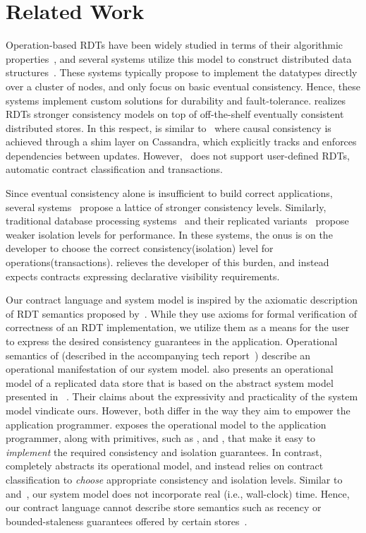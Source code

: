 \section{Related Work}
\label{sec:related}

Operation-based RDTs have been widely studied in terms of their algorithmic
properties~\cite{SSS,Burckhardt2014}, and several systems utilize this model to
construct distributed data structures~\cite{Cassandra,Bayou,Tango}. These
systems typically propose to implement the datatypes directly over a cluster of
nodes, and only focus on basic eventual consistency. Hence, these systems
implement custom solutions for durability and fault-tolerance. \name realizes
RDTs stronger consistency models on top of off-the-shelf eventually consistent
distributed stores. In this respect, \name is similar to~\cite{BoltOn} where
causal consistency is achieved through a shim layer on Cassandra, which
explicitly tracks and enforces dependencies between updates.
However,~\cite{BoltOn} does not support user-defined RDTs, automatic contract
classification and transactions.

Since eventual consistency alone is insufficient to build correct applications,
several systems~\cite{Bayou,Pileus,RedBlue} propose a lattice of stronger
consistency levels. Similarly, traditional database processing
systems~\cite{Berenson95} and their replicated variants~\cite{BailisHAT}
propose weaker isolation levels for performance. In these systems, the onus is
on the developer to choose the correct consistency(isolation) level for
operations(transactions). \name relieves the developer of this burden, and
instead expects  contracts expressing declarative visibility requirements.

Our contract language and system model is inspired by the axiomatic description
of RDT semantics proposed by~\cite{Burckhardt2014}. While they use axioms for
formal verification of correctness of an RDT implementation, we utilize them as
a means for the user to express the desired consistency guarantees in the
application. Operational semantics of \name (described in the accompanying tech
report~\cite{techrep}) describe an operational manifestation of our system
model. \cite{Burckhardt2015} also presents an operational model of a replicated
data store that is based on the abstract system model presented in
~\cite{Burckhardt2014}. Their claims about the expressivity and practicality of
the system model vindicate ours. However, both differ in the way they aim to
empower the application programmer. \cite{Burckhardt2015} exposes the
operational model to the application programmer, along with primitives, such as
,  and , that make it easy to \emph{implement} the
required consistency and isolation guarantees. In contrast, \name completely
abstracts its operational model, and instead relies on contract classification
to \emph{choose} appropriate consistency and isolation levels. Similar
to~\cite{Burckhardt2014} and~\cite{Burckhardt2015}, our system model does not
incorporate real (i.e., wall-clock) time. Hence, our contract language cannot
describe store semantics such as recency or bounded-staleness guarantees
offered by certain stores~\cite{Pileus}.

